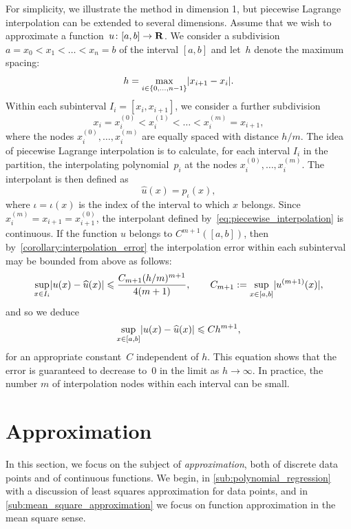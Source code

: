For simplicity, we illustrate the method in dimension 1,
but piecewise Lagrange interpolation can be extended to several dimensions.
Assume that we wish to approximate a function~$u\colon [a, b] \to \mathbf R$.
We consider a subdivision $a = x_0 < x_1 < \dotsc < x_n = b$ of the interval $[a, b]$
and let~$h$ denote the maximum spacing:
\[
    h = \max_{i \in \{0, \dotsc, n-1\}} \lvert x_{i+1} - x_i\rvert.
\]
Within each subinterval $I_i = [x_i, x_{i+1}]$,
we consider a further subdivision
\[
    x_i = x_i^{(0)} < x_i^{(1)} < \dotsc < x_i^{(m)} = x_{i+1},
\]
where the nodes $x_i^{(0)}, \dotsc, x_i^{(m)}$ are equally spaced with distance $h/m$.
The idea of piecewise Lagrange interpolation is to calculate,
for each interval $I_i$ in the partition,
the interpolating polynomial~$p_i$ at the nodes $x_i^{(0)}, \dotsc, x_i^{(m)}$.
The interpolant is then defined as
\begin{equation}
    \label{eq:piecewise_interpolation}
    \widehat u(x) = p_{\iota}(x),
\end{equation}
where $\iota = \iota(x)$ is the index of the interval to which $x$ belongs.
Since $x_i^{(m)} = x_{i+1} = x_{i+1}^{(0)}$,
the interpolant defined by~\eqref{eq:piecewise_interpolation} is continuous.
If the function $u$ belongs to $C^{m+1}([a, b])$,
then by~\cref{corollary:interpolation_error} the interpolation error within each subinterval may be bounded from above as follows:
\begin{equation}
    \label{eq:error_estimate_piecewise_interpolation}
    \sup_{x \in I_i} \lvert u(x) - \widehat u(x)\rvert \leqslant \frac{ C_{m+1} (h/m)^{m+1}}{4(m + 1)},
    \qquad C_{m+1} := \sup_{x \in [a, b]} \lvert u^{(m+1)}(x)\rvert,
\end{equation}
and so we deduce
\begin{equation*}
    \sup_{x \in [a, b]} \lvert u(x) - \widehat u(x)\rvert \leqslant C h^{m+1},
\end{equation*}
for an appropriate constant~$C$ independent of $h$.
This equation shows that the error is guaranteed to decrease to~0 in the limit as $h \to \infty$.
In practice, the number $m$ of interpolation nodes within each interval can be small.

\section{Approximation}
In this section,
we focus on the subject of \emph{approximation},
both of discrete data points and of continuous functions.
We begin, in \cref{sub:polynomial_regression} with a discussion of least squares approximation for data points,
and in \cref{sub:mean_square_approximation} we focus on function approximation in the mean square sense.

